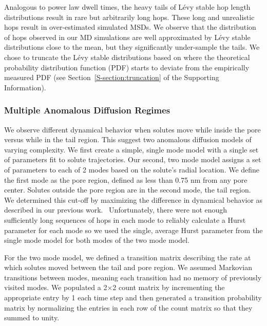 \documentclass[aps,pre,preprint,groupedaddress]{revtex4-2}
\begin{document}
  Analogous to power law dwell times, the heavy tails of L\'evy stable 
  hop length distributions result in rare but arbitrarily long hops. These long
  and unrealistic hops result in over-estimated simulated MSDs. 
  We observe that
  the distribution of hops observed in our MD simulations are well approximated 
  by L\'evy stable distributions close to the mean, but they significantly under-sample
  the tails. We chose to truncate the L\'evy stable distributions based
  on where the theoretical probability distribution function (PDF) starts to 
  deviate from the empirically measured PDF (see Section~\ref{S-section:truncation}
  of the Supporting Information).~\cite{mantegna_stochastic_1994}

  \subsubsection*{Multiple Anomalous Diffusion Regimes}
  
  We observe different dynamical behavior when solutes move while inside 
  the pore versus while in the tail region. This suggest two anomalous diffusion 
  models of varying complexity. We first create a simple, single mode model with
  a single set of parameters fit to solute trajectories.
  Our second, two mode model assigns a set of parameters to each of 2 modes based
  on the solute's radial location. We define the first mode as the pore region, 
  defined as less than 0.75 nm from any pore center. Solutes outside the pore 
  region are in the second mode, the tail region. We determined this cut-off by
  maximizing the difference in dynamical behavior as 
  described in our previous work.~\cite{coscia_chemically_2019} Unfortunately, 
  there were not enough sufficiently long sequences of hops in each mode to reliably
  calculate a Hurst parameter for each mode so we used the single, average Hurst 
  parameter from the single mode model for both modes of the two mode model.
 
  For the two mode model, we defined a transition matrix describing the rate at
  which solutes moved between the tail and pore region. We assumed Markovian transitions
  between modes, meaning each transition had no memory of previously visited modes. 
  We populated a 2$\times$2 count matrix by incrementing the appropriate entry by 1 
  each time step 
  and then generated a transition probability matrix by normalizing the entries
  in each row of the count matrix so that they summed to unity.
  
\end{document}
